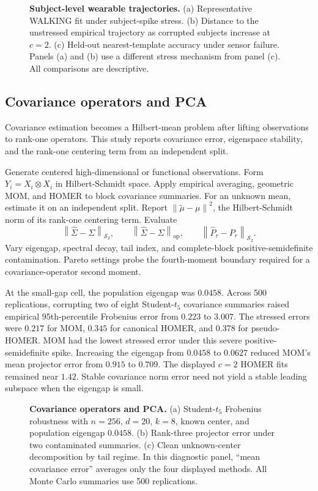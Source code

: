 \documentclass[twoside]{article}
\theoremstyle{definition}
\newcommand{\norm}[1]{\left\lVert #1\right\rVert}
\newcommand{\op}{\mathrm{op}}
\begin{document}
\begin{figure}[t]
\centering
\resizebox{\textwidth}{!}{}
\caption{\textbf{Subject-level wearable trajectories.}
(a) Representative WALKING fit under subject-spike stress. (b) Distance to the unstressed empirical trajectory as corrupted subjects increase at $c=2$. (c) Held-out nearest-template accuracy under sensor failure. Panels (a) and (b) use a different stress mechanism from panel (c). All comparisons are descriptive.}
\label{fig:wearable-trajectories}
\end{figure}

\subsection{Covariance operators and PCA}

Covariance estimation becomes a Hilbert-mean problem after lifting observations to rank-one operators. This study reports covariance error, eigenspace stability, and the rank-one centering term from an independent split.

Generate centered high-dimensional or functional observations. Form $Y_i=X_i\otimes X_i$ in Hilbert-Schmidt space. Apply empirical averaging, geometric MOM, and HOMER to block covariance summaries. For an unknown mean, estimate it on an independent split. Report $\norm{\tilde\mu-\mu}^2$, the Hilbert-Schmidt norm of its rank-one centering term. Evaluate
\[
    \norm{\hat\Sigma-\Sigma}_{\mathcal S_2},
    \qquad
    \norm{\hat\Sigma-\Sigma}_{\op},
    \qquad
    \norm{\hat P_r-P_r}_{\mathcal S_2}.
\]
Vary eigengap, spectral decay, tail index, and complete-block positive-semidefinite contamination. Pareto settings probe the fourth-moment boundary required for a covariance-operator second moment.

At the small-gap cell, the population eigengap was $0.0458$. Across 500 replications, corrupting two of eight Student-$t_5$ covariance summaries raised empirical 95th-percentile Frobenius error from $0.223$ to $3.007$. The stressed errors were $0.217$ for MOM, $0.345$ for canonical HOMER, and $0.378$ for pseudo-HOMER. MOM had the lowest stressed error under this severe positive-semidefinite spike. Increasing the eigengap from $0.0458$ to $0.0627$ reduced MOM's mean projector error from $0.915$ to $0.709$. The displayed $c=2$ HOMER fits remained near $1.42$. Stable covariance norm error need not yield a stable leading subspace when the eigengap is small.

\begin{figure}[t]
\centering
\resizebox{\textwidth}{!}{}
\caption{\textbf{Covariance operators and PCA.}
(a) Student-$t_5$ Frobenius robustness with $n=256$, $d=20$, $k=8$, known center, and population eigengap $0.0458$. (b) Rank-three projector error under two contaminated summaries. (c) Clean unknown-center decomposition by tail regime. In this diagnostic panel, ``mean covariance error'' averages only the four displayed methods. All Monte Carlo summaries use 500 replications.}
\label{fig:covariance-pca}
\end{figure}
\end{document}
